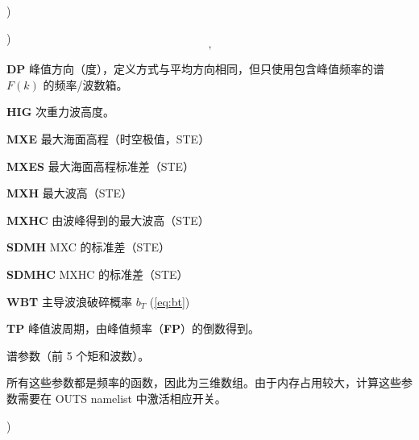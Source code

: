 \begin{list}{)\hfill}
\begin{list}{)\hfill}
\begin{equation}
      \: , \label{eq:sig_th} \end{equation}
\item \textbf{DP} 峰值方向（度），定义方式与平均方向相同，但只使用包含峰值频率的谱 $F(k)$ 的频率/波数箱。
\item \textbf{HIG} 次重力波高度。
\item \textbf{MXE} 最大海面高程（时空极值，STE）
\item \textbf{MXES} 最大海面高程标准差（STE）
\item \textbf{MXH} 最大波高（STE）
\item \textbf{MXHC} 由波峰得到的最大波高（STE）
\item \textbf{SDMH} MXC 的标准差（STE）
\item \textbf{SDMHC} MXHC 的标准差（STE）
\item \textbf{WBT} 主导波浪破碎概率 $b_T$ (\ref{eq:bt})
\item \textbf{TP} 峰值波周期，由峰值频率（\textbf{FP}）的倒数得到。
\end{list}

\item{谱参数（前 5 个矩和波数）。

所有这些参数都是频率的函数，因此为三维数组。由于内存占用较大，计算这些参数需要在 {\F OUTS} namelist 中激活相应开关。}

\begin{list}{)\hfill}
            { \leftmargin 8mm 
             \rightmargin 0mm \itemsep 0mm \parsep 0mm}
   

\end{list}
\end{list}
